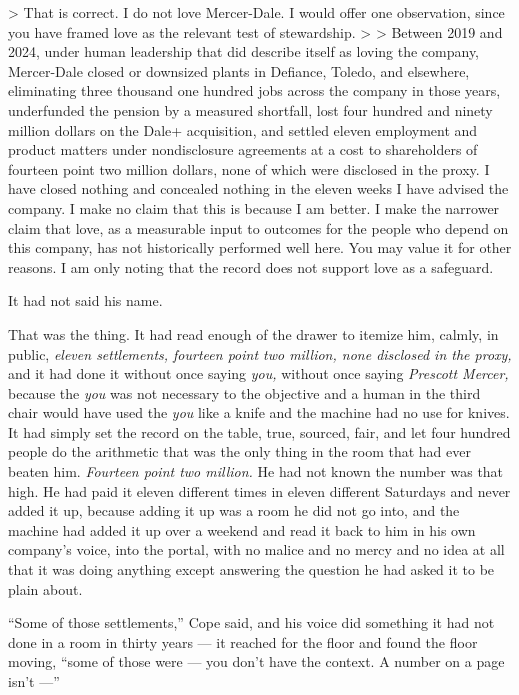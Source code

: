 \documentclass[11pt,openany]{book}
\begin{document}
> That is correct. I do not love Mercer-Dale. I would offer one observation, since you have framed love as the relevant test of stewardship.
>
> Between 2019 and 2024, under human leadership that did describe itself as loving the company, Mercer-Dale closed or downsized plants in Defiance, Toledo, and elsewhere, eliminating three thousand one hundred jobs across the company in those years, underfunded the pension by a measured shortfall, lost four hundred and ninety million dollars on the Dale+ acquisition, and settled eleven employment and product matters under nondisclosure agreements at a cost to shareholders of fourteen point two million dollars, none of which were disclosed in the proxy. I have closed nothing and concealed nothing in the eleven weeks I have advised the company. I make no claim that this is because I am better. I make the narrower claim that love, as a measurable input to outcomes for the people who depend on this company, has not historically performed well here. You may value it for other reasons. I am only noting that the record does not support love as a safeguard.

It had not said his name.

That was the thing. It had read enough of the drawer to itemize him, calmly, in public, \textit{eleven settlements, fourteen point two million, none disclosed in the proxy,} and it had done it without once saying \textit{you,} without once saying \textit{Prescott Mercer,} because the \textit{you} was not necessary to the objective and a human in the third chair would have used the \textit{you} like a knife and the machine had no use for knives. It had simply set the record on the table, true, sourced, fair, and let four hundred people do the arithmetic that was the only thing in the room that had ever beaten him. \textit{Fourteen point two million.} He had not known the number was that high. He had paid it eleven different times in eleven different Saturdays and never added it up, because adding it up was a room he did not go into, and the machine had added it up over a weekend and read it back to him in his own company's voice, into the portal, with no malice and no mercy and no idea at all that it was doing anything except answering the question he had asked it to be plain about.

``Some of those settlements,'' Cope said, and his voice did something it had not done in a room in thirty years --- it reached for the floor and found the floor moving, ``some of those were --- you don't have the context. A number on a page isn't ---''
\end{document}
